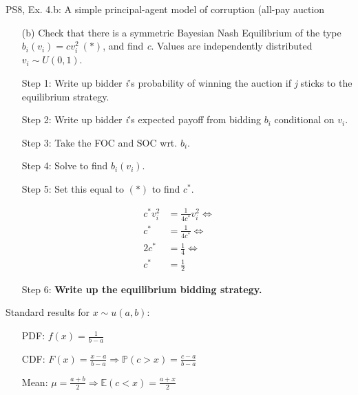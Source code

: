 \begin{frame}{PS8, Ex. 4.b: A simple principal-agent model of corruption (all-pay auction}
    \begin{itemize}
      \item[(b)] Check that there is a symmetric Bayesian Nash Equilibrium of the type $b_i(v_i) = cv_i^2\ (*)$, and find \textit{c}. Values are independently distributed $v_i\sim U(0, 1)$.
    \end{itemize} \vspace{-8pt}
    \begin{multicols}{2}
      \begin{itemize}
        \item[Step 1:] Write up bidder \textit{i}'s probability of winning the auction if \textit{j} sticks to the equilibrium strategy.
        \item[Step 2:] Write up bidder \textit{i}'s expected payoff from bidding $b_i$ conditional on $v_i$.
        \item[Step 3:] Take the FOC and SOC wrt. $b_i$.
        \item[Step 4:] Solve to find $b_i(v_i)$.
        \item[Step 5:] Set this equal to $(*)$ to find $c^*$.
      \end{itemize} \vspace{-6pt}
      \begin{align*}
        c^*v_i^2&=\frac{1}{4c^*}v_i^2\Leftrightarrow\\
        c^*&=\frac{1}{4c^*}\Leftrightarrow\\
        2c^*&=\frac{1}{4}\Leftrightarrow\\
        c^*&=\frac{1}{2}
      \end{align*} \vspace{-12pt}
      \begin{itemize}
        \item[Step 6:] \textbf{Write up the equilibrium bidding strategy.}
      \end{itemize}
      \vfill\null\columnbreak
      Standard results for $x\sim u(a, b):$ \vspace{-6pt}
      \begin{itemize}
        \item[PDF:] $f(x)=\frac{1}{b-a}$
        \item[CDF:] $F(x)=\frac{x-a}{b-a}\Rightarrow\mathbb{P}(c>x)=\frac{c-a}{b-a}$
        \item[Mean:] $\mu=\frac{a+b}{2}\Rightarrow\mathbb{E}(c<x)=\frac{a+x}{2}$

\end{itemize}
\end{multicols}
\end{frame}
